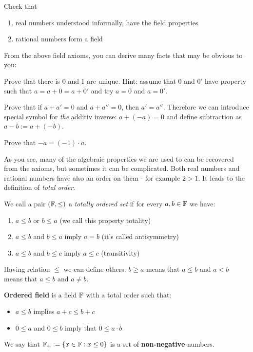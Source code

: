 \begin{exercise}
  Check that
  \begin{enumerate}
    \item real numbers understood informally, have the field properties
    \item rational numbers form a field
  \end{enumerate}
\end{exercise}

From the above field axioms, you can derive many facts that may be obvious
to you:
\begin{exercise}
  Prove that there is 0 and 1 are unique. Hint: assume that
  0 and 0' have property such that $a=a+0=a+0'$ and try $a=0$ and $a=0'$.
\end{exercise}

\begin{exercise}
  Prove that if $a+a'=0$ and $a+a''=0$, then $a'=a''$.
  Therefore we can introduce special symbol for \textit{the} additiv
  inverse: $a + (-a)=0$ and define subtraction as $a-b := a + (-b)$.
\end{exercise}

\begin{exercise}
  Prove that $-a=(-1)\cdot a$.
\end{exercise}


As you see, many of the algebraic properties we are used to can be recovered from the axioms, but sometimes it can be complicated. Both real numbers and
rational numbers have also an order on them - for example $2>1$. It leads
to the definition of \textit{total order}.

\begin{definition}
  We call a pair $(\mathbb F, \le)$ a \textit{totally ordered set} if for every $a,b\in \mathbb F$ we have:
  \begin{enumerate}
    \item $a\le b$ or $b\le a$ (we call this property totality)
    \item $a\le b$ and $b\le a$ imply $a=b$ (it's called antisymmetry)
    \item $a\le b$ and $b\le c$ imply $a\le c$ (transitivity)
  \end{enumerate}
  Having relation $\le$ we can define others: $b\ge a$ means that $a\le b$ and
  $a<b$ means that $a\le b$ and $a\neq b$.
\end{definition}

\begin{definition}
  \textbf{Ordered field} is a field $\mathbb F$ with a total order such that:
  \begin{itemize}
    \item $a\le b$ implies $a+c\le b+c$
    \item $0\le a$ and $0\le b$ imply that $0\le a\cdot b$
  \end{itemize}
  We say that $\mathbb F_+ := \{x\in \mathbb F : x \le 0\}$ is a set of \textbf{non-negative} numbers.
\end{definition}

